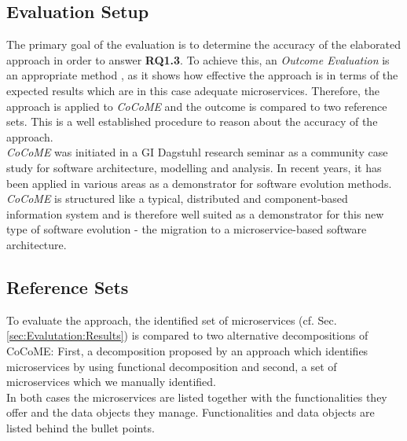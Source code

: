 \subsection{Evaluation Setup}
The primary goal of the evaluation is to determine the accuracy of the elaborated approach in order to answer \textbf{RQ1.3}. To achieve this, an \textit{Outcome Evaluation} is an appropriate method \cite{Evaluation}, as it shows how effective the approach is in terms of the expected results which are in this case adequate microservices. Therefore, the approach is applied to \textit{CoCoME} and the outcome is compared to two reference sets. This is a well established procedure to reason about the accuracy of the approach. \\
\textit{CoCoME} was initiated in a GI Dagstuhl research seminar as a community case study for software architecture, modelling and analysis.
In recent years, it has been applied in various areas as a demonstrator for software evolution methods\cite{CoCoMETechnical}. \textit{CoCoME} is structured like a typical, distributed and component-based information system and is therefore well suited as a demonstrator for this new type of software evolution - the migration to a microservice-based software architecture. 




\subsection{Reference Sets}
\label{sec:Evaluation:ReferenceSets}
To evaluate the approach, the identified set of microservices (cf. Sec.\ref{sec:Evalutation:Results}) is compared to two alternative decompositions of CoCoME: First, a decomposition proposed by an approach which identifies microservices by using functional decomposition\cite{FunctionalDecompositionHeinrich} and second, a set of microservices which we manually identified\cite{NikoCoCoMEImpl}. \\
In both cases the microservices are listed together with the functionalities they offer and the data objects they manage. Functionalities and data objects are listed behind the bullet points. \\

